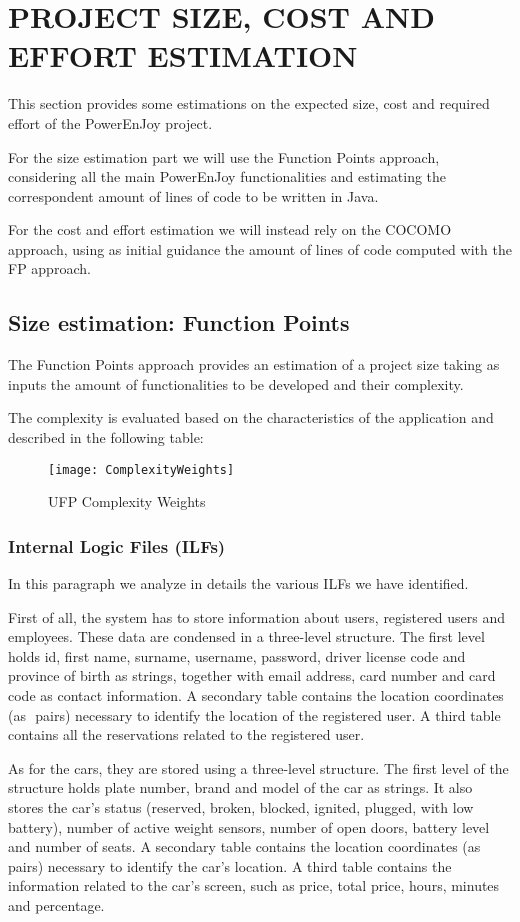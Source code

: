\section{PROJECT SIZE, COST AND EFFORT ESTIMATION}
This section provides some estimations on the expected size, cost and required effort of the PowerEnJoy project.

For the size estimation part we will use the Function Points approach, considering all the main PowerEnJoy functionalities and estimating the correspondent amount of lines of code to be written in Java. 

For the cost and effort estimation we will instead rely on the COCOMO approach, using as initial guidance the amount of lines of code computed with the FP approach.

\subsection{Size estimation: Function Points}
The Function Points approach provides an estimation of a project size taking as inputs the amount of functionalities to be developed and their complexity.

The complexity is evaluated based on the characteristics of the application and described in the following table:

\begin{figure}[H]
	\centering
	\texttt{[image: ComplexityWeights]}
	\caption{UFP Complexity Weights}
\end{figure}
\newpage
\subsubsection{Internal Logic Files (ILFs)}
In this paragraph we analyze in details the various ILFs we have identified.

First of all, the system has to store information about users, registered users and employees. These data are condensed in a three-level structure. The first level holds id, first name, surname, username, password, driver license code and province of birth as strings, together with email address, card number and card code as contact information. A secondary table contains the location coordinates (as \(<latitude, longitude>\) pairs) necessary to identify the location of the registered user. A third table contains all the reservations related to the registered user.

As for the cars, they are stored using a three-level structure. The first level of the structure holds plate number, brand and model of the car as strings. It also stores the car’s status (reserved, broken, blocked, ignited, plugged, with low battery), number of active weight sensors, number of open doors, battery level and number of seats. A secondary table contains the location coordinates (as \(<latitude, longitude>\) pairs) necessary to identify the car's location. A third table contains the information related to the car's screen, such as price, total price, hours, minutes and percentage.

